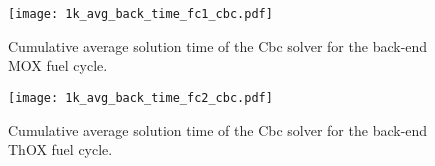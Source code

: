 \begin{figure}[h!]
  \begin{center}
    \texttt{[image: 1k\_avg\_back\_time\_fc1\_cbc.pdf]}
    \caption{
      \label{fig:1k_avg_back_time_fc1_cbc}
      Cumulative average solution time of the Cbc solver for the back-end MOX
      fuel cycle.}
  \end{center}
\end{figure}

\begin{figure}[h!]
  \begin{center}
    \texttt{[image: 1k\_avg\_back\_time\_fc2\_cbc.pdf]}
    \caption{
      \label{fig:1k_avg_back_time_fc2_cbc}
      Cumulative average solution time of the Cbc solver for the back-end ThOX
      fuel cycle.}
  \end{center}
\end{figure}





